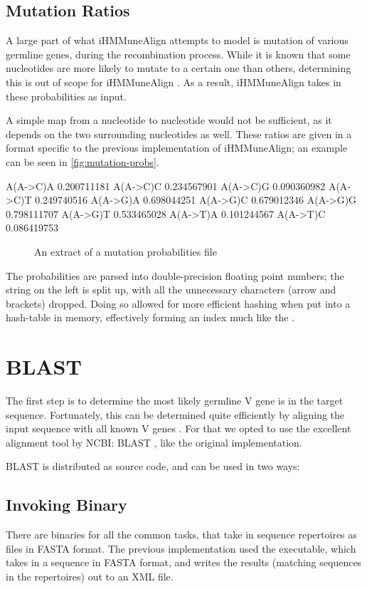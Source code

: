 \subsection{Mutation Ratios}
A large part of what iHMMuneAlign attempts to model is mutation of various germline genes, during the recombination process. While it is known that some nucleotides are more likely to mutate to a certain one than others, determining this is out of scope for iHMMuneAlign \autocite{iHMMuneAlign}. As a result, iHMMuneAlign takes in these probabilities as input.

A simple map from a nucleotide to nucleotide would not be sufficient, as it depends on the two surrounding nucleotides as well. These ratios are given in a format specific to the previous implementation of iHMMuneAlign; an example can be seen in \autoref{fig:mutation-probs}.

\begin{verbbox}
A(A->C)A 	0.200711181
A(A->C)C 	0.234567901
A(A->C)G 	0.090360982
A(A->C)T 	0.249740516
A(A->G)A 	0.698044251
A(A->G)C 	0.679012346
A(A->G)G 	0.798111707
A(A->G)T 	0.533465028
A(A->T)A 	0.101244567
A(A->T)C 	0.086419753
\end{verbbox}

\begin{figure}
    \centering
    \theverbbox
    \caption{An extract of a mutation probabilities file}
    \label{fig:mutation-probs}
\end{figure}

The probabilities are parsed into double-precision floating point numbers; the string on the left is split up, with all the unnecessary characters (arrow and brackets) dropped. Doing so allowed for more efficient hashing when put into a hash-table in memory, effectively forming an index much like the .

\section{BLAST}
The first step is to determine the most likely germline V gene is in the target sequence. Fortunately, this can be determined quite efficiently by aligning the input sequence with all known V genes \cite{iHMMuneAlign}. For that we opted to use the excellent alignment tool by NCBI: BLAST \cite{blast}, like the original implementation.

BLAST is distributed as source code, and can be used in two ways:
\subsection{Invoking Binary}
\label{sec:blast-bin}
There are binaries for all the common tasks, that take in sequence repertoires as files in FASTA \autocite{fasta} format. The previous implementation used the  executable, which takes in a sequence in FASTA format, and writes the results (matching sequences in the repertoires) out to an XML file.

